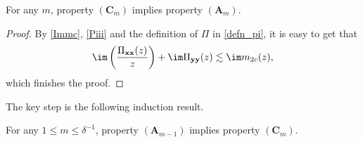 \begin{lemma}\label{lemm_boot2}
For any $m$, property ${(\mathbf C_m)}$ implies property $(\mathbf A_m)$.
\end{lemma}
\begin{proof}
By \eqref{Immc}, \eqref{Piii} and the definition of $\Pi$ in \eqref{defn_pi}, it is easy to get that 
$$\im \left(\frac{\Pi_{\mathbf x\mathbf x}(z)}{z}\right) + \im \Pi_{\mathbf y\mathbf y}(z)\lesssim \im m_{2c}(z) ,$$
which finishes the proof.
\end{proof}

The key step is the following induction result.
\begin{lemma}\label{lemm_boot}
For any $1\le m\le \delta^{-1}$, property $(\mathbf A_{m-1})$ implies property $(\mathbf C_m)$.
\end{lemma}


